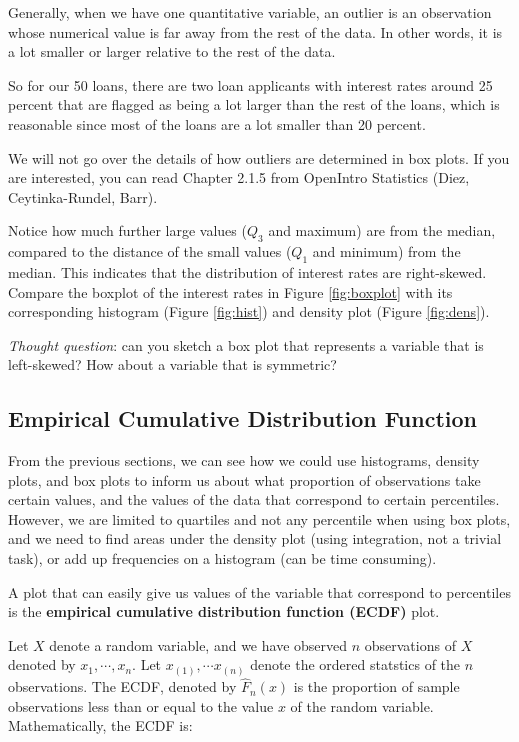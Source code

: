 \documentclass[
]{book}
\begin{document}
Generally, when we have one quantitative variable, an outlier is an observation whose numerical value is far away from the rest of the data. In other words, it is a lot smaller or larger relative to the rest of the data.

So for our 50 loans, there are two loan applicants with interest rates around 25 percent that are flagged as being a lot larger than the rest of the loans, which is reasonable since most of the loans are a lot smaller than 20 percent.

We will not go over the details of how outliers are determined in box plots. If you are interested, you can read Chapter 2.1.5 from OpenIntro Statistics (Diez, Ceytinka-Rundel, Barr).

Notice how much further large values (\(Q_3\) and maximum) are from the median, compared to the distance of the small values (\(Q_1\) and minimum) from the median. This indicates that the distribution of interest rates are right-skewed. Compare the boxplot of the interest rates in Figure \ref{fig:boxplot} with its corresponding histogram (Figure \ref{fig:hist}) and density plot (Figure \ref{fig:dens}).

\emph{Thought question}: can you sketch a box plot that represents a variable that is left-skewed? How about a variable that is symmetric?

\subsection{Empirical Cumulative Distribution Function}\label{ecdf}

From the previous sections, we can see how we could use histograms, density plots, and box plots to inform us about what proportion of observations take certain values, and the values of the data that correspond to certain percentiles. However, we are limited to quartiles and not any percentile when using box plots, and we need to find areas under the density plot (using integration, not a trivial task), or add up frequencies on a histogram (can be time consuming).

A plot that can easily give us values of the variable that correspond to percentiles is the \textbf{empirical cumulative distribution function (ECDF)} plot.

Let \(X\) denote a random variable, and we have observed \(n\) observations of \(X\) denoted by \(x_1, \cdots, x_n\). Let \(x_{(1)}, \cdots x_{(n)}\) denote the ordered statstics of the \(n\) observations. The ECDF, denoted by \(\hat{F}_n(x)\) is the proportion of sample observations less than or equal to the value \(x\) of the random variable. Mathematically, the ECDF is:
\end{document}
